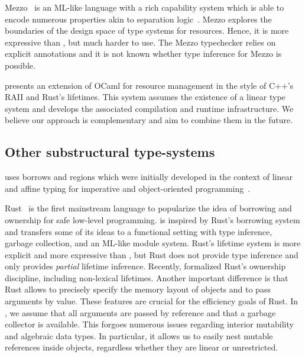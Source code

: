 Mezzo~\citep{DBLP:phd/hal/Protzenko14} is an ML-like language
with a rich capability system which is able to encode numerous
properties akin to separation logic~\citep{DBLP:conf/lics/Reynolds02}.
Mezzo explores the  boundaries of the design space of type systems for
resources. Hence, it is more expressive than \lang, but
much harder to use. The Mezzo typechecker relies on explicit
annotations and it is not known whether type inference for Mezzo is possible.

\citet{DBLP:journals/corr/abs-1803-02796} presents
an extension of OCaml for resource management in the style of C++'s RAII
and Rust's lifetimes. This system assumes
the existence of a linear type system and develops the associated compilation
and runtime infrastructure. We believe our approach is
complementary and aim to combine them in the future.

\subsection{Other substructural type-systems}

\lang uses borrows and regions
which were initially developed in the context of linear and affine
typing for  imperative and
object-oriented
programming~\citep{DBLP:conf/popl/BoylandR05,DBLP:conf/pldi/GrossmanMJHWC02}.

Rust~\citep{rust} is the first
mainstream language to popularize the idea of borrowing and ownership
for safe low-level programming.
\lang is inspired by Rust's borrowing system and transfers some of its
ideas  to a functional setting with type inference, garbage collection, and
an ML-like module system.
Rust's lifetime system is more explicit and more expressive than \lang,
but Rust does not provide type inference
and only provides \emph{partial} lifetime inference.
Recently, \citet{DBLP:journals/corr/abs-1903-00982}
formalized Rust's ownership discipline, including non-lexical lifetimes.
Another important difference is that Rust allows
to precisely specify the memory layout of objects
and to pass arguments by value.
These features are crucial for the efficiency goals of Rust.
In \lang, we assume that all arguments are passed by reference and
that a garbage collector is available. This forgoes numerous
issues regarding interior mutability and algebraic data types.
In particular, it
allows us to easily nest mutable references inside objects, regardless
whether they are linear or unrestricted.

